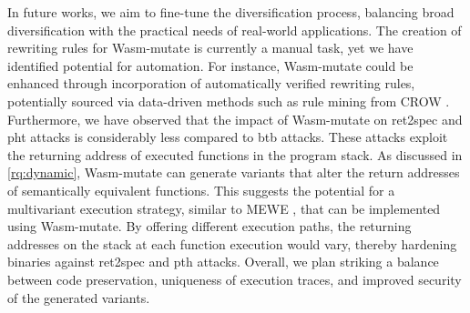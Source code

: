 \documentclass[sigplan,screen]{acmart}
\newcommand{\tool}{Wasm-mutate\xspace}
\begin{document}
In future works, we aim to fine-tune the diversification process, balancing broad diversification with the practical needs of real-world applications. 
The creation of rewriting rules for \tool is currently a manual task, yet we have identified potential for automation. 
For instance, \tool could be enhanced through incorporation of automatically verified rewriting rules, potentially sourced via data-driven methods such as rule mining from CROW \cite{10026577}.
Furthermore, we have observed that the impact of \tool on ret2spec and pht attacks is considerably less compared to btb attacks. 
These attacks exploit the returning address of executed functions in the program stack. 
As discussed in \ref{rq:dynamic}, \tool can generate variants that alter the return addresses of semantically equivalent functions. 
This suggests the potential for a multivariant execution strategy, similar to MEWE \cite{MEWE}, that can be implemented using \tool. 
By offering different execution paths, the returning addresses on the stack at each function execution would vary, thereby hardening binaries against ret2spec and pth attacks.
Overall, we plan striking a balance between code preservation, uniqueness of execution traces, and improved security of the generated variants.




\end{document}
